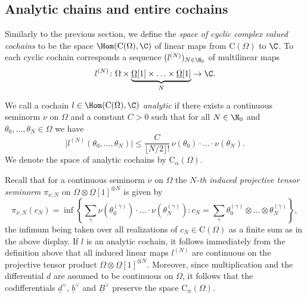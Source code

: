 \documentclass[a4paper, english, 12pt, bibliography=totocnumbered,
index=totoc]{scrartcl}
\begin{document}
\subsection{Analytic chains and entire cochains}\label{Section: entire}
Similarly to the previous section, we define the \textit{space of cyclic
complex valued cochains} to be the space $\Hom(\mathrm{C}(\Omega), \C)$ of
linear maps from $\mathrm{C}(\Omega)$ to $\C$.
To each cyclic cochain corresponds a
sequence $(l^{(N)})_{N \in \N_0}$ of multilinear maps
\begin{equation*}
	l^{(N)} \colon \Omega \times \underbrace{\underline{\Omega}[1] \times
		\ldots \times \underline{\Omega}[1]}_N \to \C.
\end{equation*}
\begin{defn}\label{Analytic}
	We call a cochain $l \in \Hom(\mathrm{C}(\Omega), \C)$ \textit{analytic}
	if there
	exists a continuous seminorm $\nu$ on $\Omega$ and a constant $C > 0$ such
	that for all $N \in \N_0$ and $\theta_0, \ldots, \theta_N \in \Omega$ we
	have
	\begin{equation*}
		\lvert l^{(N)}(\theta_0, \ldots, \theta_N) \rvert \leq
		\frac{C}{\lfloor N/2 \rfloor!} \, \nu(\theta_0) \cdot \ldots \cdot
		\nu(\theta_N).
	\end{equation*}
	We denote the space of analytic cochains by $\mathrm{C}_{\alpha}(\Omega)$.
\end{defn}
Recall that for a continuous seminorm $\nu$ on $\Omega$ the
\textit{$N$-th induced projective tensor seminorm $\pi_{\nu, N}$} on $\Omega
\otimes \underline{\Omega}[1]^{\otimes N}$ is given by
\begin{equation*}
	\pi_{\nu, N}(c_N) = \inf\left\{\sum_{\gamma} \nu(\theta_0^{(\gamma)})
	\cdot
	\ldots \cdot \nu(\theta_N^{(\gamma)}) : c_N = \sum_{\gamma}
	\theta_0^{(\gamma)} \otimes \ldots \otimes \theta_N^{(\gamma)}\right\},
\end{equation*}
the infimum being taken over all realizations of $c_N \in \mathrm{C}(\Omega)$
as a finite sum as in the above display.
If $l$ is an analytic cochain, it follows immediately from the definition
above that all induced linear maps $l^{(N)}$ are continuous on the projective 
tensor product $\Omega \otimes
\underline{\Omega}[1]^{\otimes N}$.
Moreover, since multiplication and the differential $d$ are assumed to be
continuous on $\Omega$, it follows that the codifferentials
$\underline{d}^\vee$,
$\underline{b}^\vee$ and $\underline{B}^\vee$ preserve the space
$\mathrm{C}_{\alpha}(\Omega)$.
\end{document}

